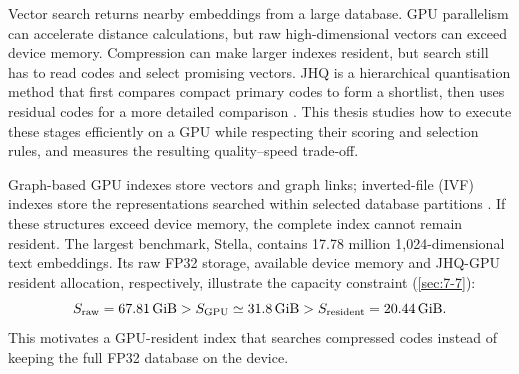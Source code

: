 Vector search returns nearby embeddings from a large database. GPU
parallelism can accelerate distance calculations, but raw high-dimensional
vectors can exceed device memory. Compression can make larger indexes
resident, but search still has to read codes and select promising vectors.
JHQ is a hierarchical quantisation method that first compares compact
primary codes to form a shortlist, then uses residual codes for a more
detailed comparison \cite{jhq}. This thesis studies how to execute these
stages efficiently on a GPU while respecting their scoring and selection
rules, and measures the resulting quality--speed trade-off.

Graph-based GPU indexes store vectors and graph links; inverted-file
(IVF) indexes store the representations searched within selected database
partitions \cite{cagra,johnson_gpu,ivfrabitq}. If these structures exceed
device memory, the complete index cannot remain resident.
The largest benchmark, Stella, contains 17.78 million 1,024-dimensional
text embeddings. Its raw FP32 storage, available device memory and
JHQ-GPU resident allocation, respectively, illustrate the capacity
constraint (\cref{sec:7-7}):
\[
 S_{\rm raw}=67.81\,\mathrm{GiB}
 >S_{\rm GPU}\simeq31.8\,\mathrm{GiB}
 >S_{\rm resident}=20.44\,\mathrm{GiB}.
\]
This motivates a GPU-resident index that searches compressed codes
instead of keeping the full FP32 database on the device.
